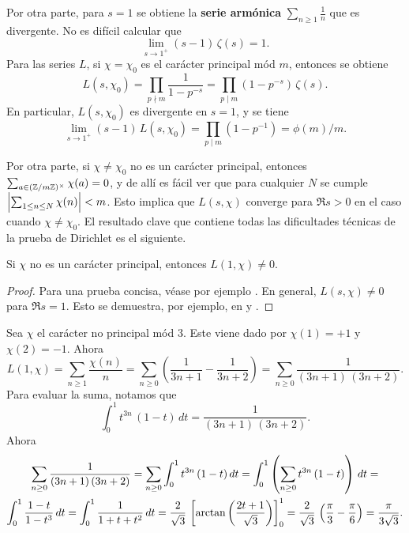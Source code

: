 Por otra parte, para $s = 1$ se obtiene la \textbf{serie armónica}
$\sum_{n\ge 1} \frac{1}{n}$ que es divergente. No es difícil calcular que
\begin{equation}
  \label{eq:residuo-de-zeta-en-1}
  \lim_{s\to 1^+} (s-1) \, \zeta (s) = 1.
\end{equation}
Para las series $L$, si $\chi = \chi_0$ es el carácter principal mód $m$,
entonces se obtiene
\[ L (s, \chi_0) = \prod_{p \nmid m} \frac{1}{1 - p^{-s}}
   = \prod_{p \mid m} (1 - p^{-s}) \, \zeta (s). \]
En particular, $L (s, \chi_0)$ es divergente en $s = 1$, y se tiene
\[ \lim_{s\to 1^+} (s-1)\,L (s, \chi_0) = \prod_{p \mid m} (1 - p^{-1})
   = \phi (m)/m. \]

Por otra parte, si $\chi \ne \chi_0$ no es un carácter principal, entonces
$\sum_{a \in (\mathbb{Z}/m\mathbb{Z})^\times} \chi (a) = 0$, y de allí es fácil ver que
para cualquier $N$ se cumple $\Bigl|\sum_{1 \le n \le N} \chi (n)\Bigr| < m$.
Esto implica que $L (s,\chi)$ converge para $\Re s > 0$ en el caso cuando
$\chi \ne \chi_0$. El resultado clave que contiene todas las dificultades
técnicas de la prueba de Dirichlet es el siguiente.

\begin{teorema}
  \label{thm:L(1,chi)}
  Si $\chi$ no es un carácter principal, entonces $L (1,\chi) \ne 0$.

  \begin{proof}
    Para una prueba concisa, véase por ejemplo \cite[\S 16.5]{Ireland-Rosen}.
    En general, $L (s,\chi) \ne 0$ para $\Re s = 1$. Esto se demuestra, por
    ejemplo, en \cite[Chapter~5]{Everiste-ANT} y
    \cite[Chapter~6]{Hlawka-Taschner-Schoissengeier}.
  \end{proof}
\end{teorema}

\begin{ejemplo}
  Sea $\chi$ el carácter no principal mód $3$. Este viene dado por
  $\chi (1) = +1$ y $\chi (2) = -1$. Ahora
  $$L (1,\chi) = \sum_{n \ge 1} \frac{\chi (n)}{n} = \sum_{n \ge 0} \left(\frac{1}{3n + 1} - \frac{1}{3n+2}\right) = \sum_{n \ge 0} \frac{1}{(3n+1)\,(3n+2)}.$$
  Para evaluar la suma, notamos que
  $$\int_0^1 t^{3n} \, (1-t) \, dt = \frac{1}{(3n+1)\,(3n+2)}.$$
  Ahora
  \begin{multline*}
    \sum_{n \ge 0} \frac{1}{(3n+1)\,(3n+2)} = \sum_{n \ge 0} \int_0^1 t^{3n} \, (1-t) \, dt = \int_0^1 \left(\sum_{n \ge 0} t^{3n} \, (1-t)\right) \, dt =\\
    \int_0^1 \frac{1-t}{1-t^3}\,dt = \int_0^1 \frac{1}{1 + t + t^2}\,dt = \frac{2}{\sqrt{3}}\,\left[\arctan \left(\frac{2t+1}{\sqrt{3}}\right)\right]_0^1 = \frac{2}{\sqrt{3}}\,\left(\frac{\pi}{3} - \frac{\pi}{6}\right) = \frac{\pi}{3\sqrt{3}}. \qedhere
  \end{multline*}
\end{ejemplo}

